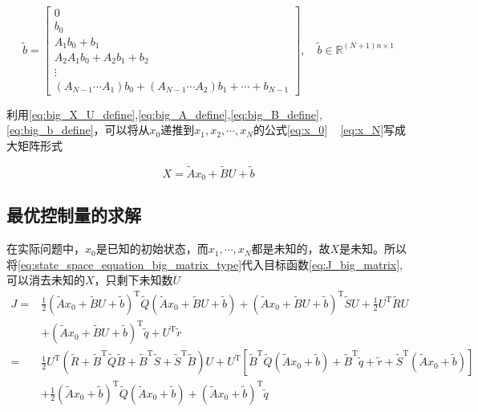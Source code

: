 \documentclass[withoutpreface,bwprint]{NoteBook}
\begin{document}
\begin{equation}
\label{eq:big_b_define}
\tilde{b} =  \begin{bmatrix}
0 \\
b_0 \\
A_1 b_0+b_1 \\
A_2 A_1 b_0 + A_2 b_1 + b_2 \\
\vdots \\
(A_{N-1} \cdots A_1) b_0 + (A_{N-1} \cdots A_2) b_1 + \cdots+b_{N-1} 
\end{bmatrix} 
,\quad  \tilde{b} \in \mathbb{R}^{(N+1) n \times 1}
\end{equation}


利用\cref{eq:big_X_U_define},\cref{eq:big_A_define},\cref{eq:big_B_define},\cref{eq:big_b_define}，可以将从$x_0$递推到$x_1,x_2,\cdots,x_N$的公式\cref{eq:x_0} ~ \cref{eq:x_N}​写成大矩阵形式

\begin{equation}
\label{eq:state_space_equation_big_matrix_type}
X = \tilde{A}x_0 + \tilde{B}U+\tilde{b}
\end{equation}

\subsection{最优控制量的求解}

在实际问题中，$x_0$是已知的初始状态，而$x_1,\cdots,x_N$都是未知的，故$X$是未知。所以将\cref{eq:state_space_equation_big_matrix_type}代入目标函数\cref{eq:J_big_matrix},可以消去未知的$X$，只剩下未知数$U$
\begin{align}
\label{eq:J_big_matrix_type_remove_X}
J =& \frac{1}{2} \left( \tilde{A}x_0 + \tilde{B}U+\tilde{b} \right)^\mathrm{T}\tilde{Q}\left( \tilde{A}x_0 + \tilde{B}U+\tilde{b} \right)
+ \left( \tilde{A}x_0 + \tilde{B}U+\tilde{b} \right)^\mathrm{T}\tilde{S} U 
+ \frac{1}{2} U^\mathrm{T}\tilde{R}U \nonumber \\
& + \left( \tilde{A}x_0 + \tilde{B}U+\tilde{b} \right)^\mathrm{T}\tilde{q} 
+ U^\mathrm{T}\tilde{r} \nonumber \\

=& \frac{1}{2} U^\mathrm{T} \left(\tilde{R}+\tilde{B}^\mathrm{T}\tilde{Q}\tilde{B} + \tilde{B}^\mathrm{T}\tilde{S} + \tilde{S}^\mathrm{T}\tilde{B} \right) U 
+ U^\mathrm{T} \left[ \tilde{B}^\mathrm{T}\tilde{Q} \left(\tilde{A}x_0 +\tilde{b} \right)+ \tilde{B}^\mathrm{T}\tilde{q} + \tilde{r} + \tilde{S}^\mathrm{T} \left(\tilde{A}x_0 +\tilde{b} \right) \right] \nonumber \\
&+ \frac{1}{2} \left(\tilde{A}x_0 +\tilde{b} \right)^\mathrm{T} \tilde{Q} \left(\tilde{A}x_0 +\tilde{b} \right) 
+ \left(\tilde{A}x_0 +\tilde{b} \right)^\mathrm{T}\tilde{q}
\end{align}
\end{document}
